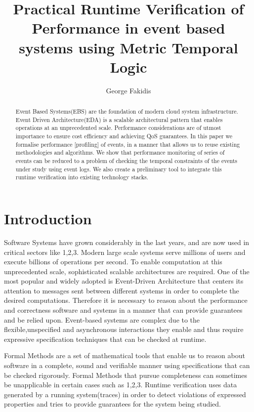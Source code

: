 \documentclass{article}
\title{Practical Runtime Verification of Performance in event based systems using Metric Temporal Logic}
\author{George Fakidis}
\begin{document}
\maketitle
\begin{abstract}
	Event Based Systems(EBS) are the foundation of modern cloud system infrastructure. Event Driven Architecture(EDA) is a scalable architectural pattern that enables operations at an unprecedented scale. Performance considerations are of utmost importance to ensure cost efficiency and achieving QoS guarantees. In this paper we formalise performance [profiling] of events, in a manner that allows us to reuse existing methodologies and algorithms. We show that performance monitoring of series of events can be reduced to a problem of checking the temporal constraints of the events under study using event logs. We also create a preliminary tool to integrate this runtime verification into existing technology stacks.
\end{abstract}


\section{Introduction}
Software Systems have grown considerably in the last years, and are now used in critical sectors like 1,2,3.
Modern large scale systems serve millions of users and execute billions of operations per second.
To enable computation at this unprecedented scale, sophisticated scalable architectures are required.
One of the most popular and widely adopted is Event-Driven Architecture that centers its attention to messages sent between different systems in order to complete the desired computations.
Therefore it is necessary to reason about the performance and correctness software and systems in a manner that can provide guarantees and be relied upon. Event-based systems are complex due to the flexible,unspecified and asynchronous interactions they enable and thus require expressive specification techniques that can be checked at runtime.
\par
[This will be written from Wikipedia and mb a couple foundational papers] Formal Methods are a set of mathematical tools that enable us to reason about software in a complete, sound and verifiable manner using specifications that can be checked rigorously. Formal Methods that pursue completeness can sometimes be unapplicable in certain cases such as 1,2,3. Runtime verification uses data generated by a running system(traces) in order to detect violations of expressed properties and tries to provide guarantees for the system being studied.
\end{document}
